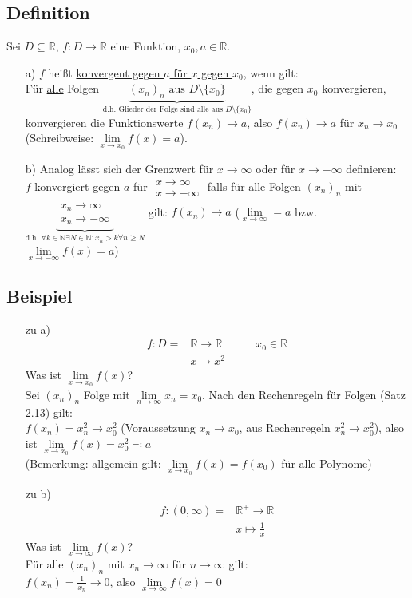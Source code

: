 \documentclass[12pt, titlepage]{article}
\newcommand{\R}{\mathds{R}}
\newcommand{\N}{\mathds{N}}
\newcommand{\infn}{n\rightarrow\infty}
\renewcommand{\>}{\rightarrow}
\renewcommand{\*}{\cdot}
\begin{document}
	\subsection{Definition}
	Sei $D\subseteq\R$, $f\colon D\>\R$ eine Funktion, $x_0,a\in\R$.
	\begin{itemize}
		\item[a)] $f$ heißt \underline{konvergent gegen $a$ für $x$ gegen $x_0$}, wenn gilt:\\
		Für \underline{alle} Folgen $\underbrace{(x_n)_n\textrm{ aus }D\setminus\{x_0\}}_{\textrm{d.h. Glieder der Folge sind alle aus } D\setminus\{x_0\}}$, die gegen $x_0$ konvergieren, konvergieren die Funktionswerte $f(x_n)\> a$, also $f(x_n)\> a$ für $x_n\> x_0$ (Schreibweise: $\lim\limits_{x\> x_0}f(x)=a$).
		\item[b)] Analog lässt sich der Grenzwert für $x\>\infty$ oder für $x\>-\infty$ definieren:\\
		$f$ konvergiert gegen $a$ für
		$\begin{array}{l}
		x\>\infty\\
		x\>-\infty
		\end{array}$ falls für alle Folgen $(x_n)_n$ mit $\underbrace{\begin{array}{l}
		x_n\>\infty\\
		x_n\>-\infty
		\end{array}}_{\textrm{d.h. }\forall k\in\N\exists N\in\N\colon x_n>k\forall n\geq N}$ gilt: $f(x_n)\> a$ ($\lim\limits_{x\>\infty}=a$ bzw. $\lim\limits_{x\>-\infty}f(x)=a$)
	\end{itemize}
	\subsection{Beispiel}
	\begin{itemize}
		\item[zu a)] \begin{align*}
			f\colon D=&\R\>\R\qquad\quad x_0\in\R\\
			&x\> x^2
		\end{align*}
		Was ist $\lim\limits_{x\> x_0}f(x)$?\\
		Sei $(x_n)_n$ Folge mit $\lim\limits_{\infn}x_n=x_0$. Nach den Rechenregeln für Folgen (Satz 2.13) gilt:\\
		$f(x_n)=x^2_n\> x^2_0$ (Voraussetzung $x_n\> x_0$, aus Rechenregeln $x^2_n\> x^2_0$), also ist $\lim\limits_{x\> x_0}f(x)=x^2_0\eqqcolon a$\\
		(Bemerkung: allgemein gilt: $\lim\limits_{x\> x_0}f(x)=f(x_0)$ für alle Polynome)
		\item[zu b)] \begin{align*}
			f\colon (0,\infty)=&\R^+\>\R\\&x\mapsto\frac{1}{x}
		\end{align*}
		Was ist $\lim\limits_{x\>\infty}f(x)$?\\
		Für alle $(x_n)_n$ mit $x_n\>\infty$ für $\infn$ gilt:\\
		$f(x_n)=\frac{1}{x_n}\>0$, also $\lim\limits_{x\>\infty}f(x)=0$
	\end{itemize}
\end{document}
